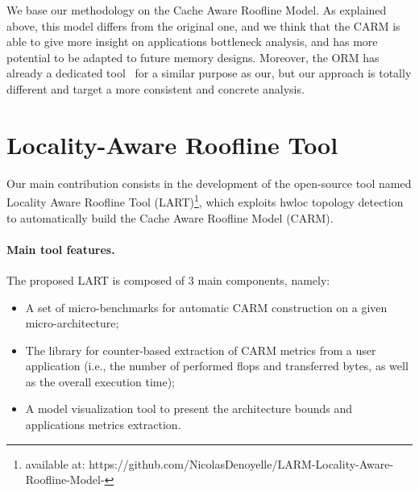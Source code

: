 \documentclass[twoside,twocolumn,8pt]{extarticle}
\begin{document}
We base our methodology on the Cache Aware Roofline Model. 
As explained above, this model differs from the original one, and we think that the CARM is able to give more insight on
applications bottleneck analysis, and has more potential to be adapted to future memory designs. Moreover, the ORM has already a
dedicated tool~\cite{Lo2015} for a similar purpose as our, but our approach is totally different and target a more consistent and
concrete analysis.

\section{Locality-Aware Roofline Tool}\label{sec:contrib}

Our main contribution consists in the development of the open-source tool named Locality Aware Roofline Tool (LART)\footnote{available at: https://github.com/NicolasDenoyelle/LARM-Locality-Aware-Roofline-Model-}, which
exploits hwloc topology detection to automatically build the Cache Aware Roofline Model (CARM).

\paragraph*{Main tool features.}

The proposed LART is composed of 3 main components, namely:
\begin{itemize}
\item A set of micro-benchmarks for automatic CARM construction on a given micro-architecture;
\item The library for counter-based extraction  of CARM metrics from a user application (i.e., the number of performed flops and
  transferred bytes, as well as the overall execution time);
\item A model visualization tool to present the architecture bounds and applications metrics extraction.
\end{itemize}
\end{document}
